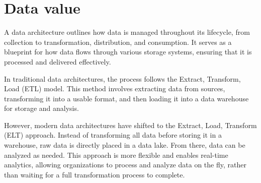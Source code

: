 \section{Data value}

A data architecture outlines how data is managed throughout its lifecycle, from collection to transformation, distribution, and consumption. 
It serves as a blueprint for how data flows through various storage systems, ensuring that it is processed and delivered effectively.

In traditional data architectures, the process follows the Extract, Transform, Load (ETL) model. 
This method involves extracting data from sources, transforming it into a usable format, and then loading it into a data warehouse for storage and analysis.

However, modern data architectures have shifted to the Extract, Load, Transform (ELT) approach. 
Instead of transforming all data before storing it in a warehouse, raw data is directly placed in a data lake. 
From there, data can be analyzed as needed. 
This approach is more flexible and enables real-time analytics, allowing organizations to process and analyze data on the fly, rather than waiting for a full transformation process to complete.

